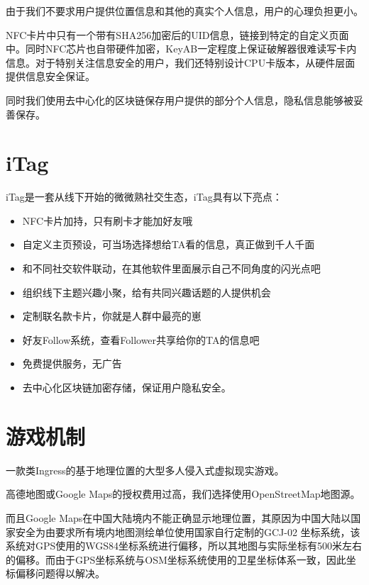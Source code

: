 \documentclass[UTF8]{ctexart}
\begin{document}
由于我们不要求用户提供位置信息和其他的真实个人信息，用户的心理负担更小。

NFC卡片中只有一个带有SHA256加密后的UID信息，链接到特定的自定义页面中。同时NFC芯片也自带硬件加密，KeyAB一定程度上保证破解器很难读写卡内信息。对于特别关注信息安全的用户，我们还特别设计CPU卡版本，从硬件层面提供信息安全保证。

同时我们使用去中心化的区块链保存用户提供的部分个人信息，隐私信息能够被妥善保存。

\section{iTag}
iTag是一套从线下开始的微微熟社交生态，iTag具有以下亮点：

\begin{itemize}
    \item NFC卡片加持，只有刷卡才能加好友哦
    \item 自定义主页预设，可当场选择想给TA看的信息，真正做到千人千面
    \item 和不同社交软件联动，在其他软件里面展示自己不同角度的闪光点吧
    \item 组织线下主题兴趣小聚，给有共同兴趣话题的人提供机会
    \item 定制联名款卡片，你就是人群中最亮的崽
    \item 好友Follow系统，查看Follower共享给你的TA的信息吧~
    \item 免费提供服务，无广告
    \item 去中心化区块链加密存储，保证用户隐私安全。
\end{itemize}

\section{游戏机制}

一款类Ingress的基于地理位置的大型多人侵入式虚拟现实游戏。

高德地图或Google Maps的授权费用过高，我们选择使用OpenStreetMap地图源。

而且Google Maps在中国大陆境内不能正确显示地理位置，其原因为中国大陆以国家安全为由要求所有境内地图测绘单位使用国家自行定制的GCJ-02 坐标系统，该系统对GPS使用的WGS84坐标系统进行偏移，所以其地图与实际坐标有500米左右的偏移。而由于GPS坐标系统与OSM坐标系统使用的卫星坐标体系一致，因此坐标偏移问题得以解决。
\end{document}
